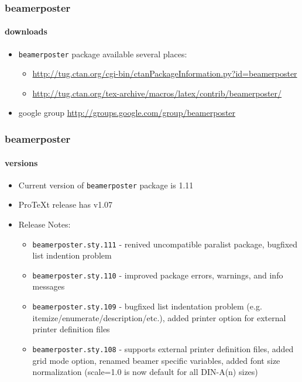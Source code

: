 \documentclass[11pt]{beamer}
\begin{document}
\begin{frame}
\frametitle{beamerposter}\framesubtitle{downloads}
			\begin{itemize}
				\item \verb|beamerposter| package available several places:
				\begin{itemize}
					\item \url{http://tug.ctan.org/cgi-bin/ctanPackageInformation.py?id=beamerposter}
				\item \url{http://tug.ctan.org/tex-archive/macros/latex/contrib/beamerposter/}
				\end{itemize}
				\item google group \url{http://groups.google.com/group/beamerposter}
			\end{itemize}
\end{frame}

\begin{frame}
\frametitle{beamerposter}\framesubtitle{versions}
			\begin{itemize}
				\item Current version of \verb|beamerposter| package is 1.11
				\item ProTeXt release has v1.07
				\item Release Notes:
					\begin{itemize}
						\item \verb|beamerposter.sty.111| - renived uncompatible paralist package, bugfixed list indention problem
						\item \verb|beamerposter.sty.110| - improved package errors, warnings, and info messages
						\item \verb|beamerposter.sty.109| - bugfixed list indentation problem (e.g. itemize/enumerate/description/etc.), added printer option for external printer definition files
						\item \verb|beamerposter.sty.108| - supports external printer definition files, added grid mode option, renamed beamer specific variables, added font size normalization (scale=1.0 is now default for all DIN-A(n) sizes)
					\end{itemize}
			\end{itemize}
\end{frame}
\end{document}
